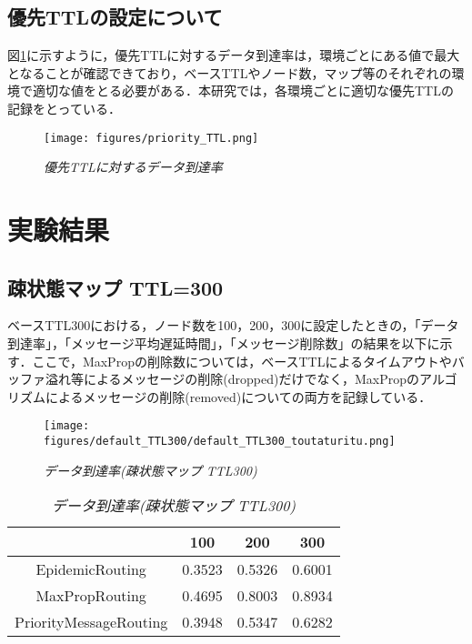 \documentclass[11pt]{icsthesis}
\begin{document}
\section{優先TTLの設定について}
図\ref{priorityTTL}に示すように，優先TTLに対するデータ到達率は，環境ごとにある値で最大となることが確認できており，ベースTTLやノード数，マップ等のそれぞれの環境で適切な値をとる必要がある．本研究では，各環境ごとに適切な優先TTLの記録をとっている．
\begin{figure}[H]
	\centering
	\texttt{[image: figures/priority\_TTL.png]}
	\caption[]{\it{優先TTLに対するデータ到達率}}
	\label{priorityTTL}
\end{figure}
\chapter{実験結果}

\section{疎状態マップ TTL=300}
ベースTTL300における，ノード数を100，200，300に設定したときの，「データ到達率」，「メッセージ平均遅延時間」，「メッセージ削除数」の結果を以下に示す．ここで，MaxPropの削除数については，ベースTTLによるタイムアウトやバッファ溢れ等によるメッセージの削除(dropped)だけでなく，MaxPropのアルゴリズムによるメッセージの削除(removed)についての両方を記録している．

\begin{figure}[h]
\centering
\texttt{[image: figures/default\_TTL300/default\_TTL300\_toutaturitu.png]}
\caption[]{\it{データ到達率(疎状態マップ TTL300)}}
\label{somituttl300deliveryprobgraph}
\end{figure}

\begin{table}[H]
 \begin{center}
      \caption[]{\it{データ到達率(疎状態マップ TTL300)}}
      \label{somituTtl300deliveryprob}
      \begin{tabular}{|c|c|c|c|}
\hline
&100&200&300\\
\hline
EpidemicRouting&0.3523&0.5326&0.6001\\
\hline
MaxPropRouting&0.4695&0.8003&0.8934\\
\hline
PriorityMessageRouting&0.3948&0.5347&0.6282\\
\hline
      \end{tabular}
    \end{center}
\end{table}
\end{document}
